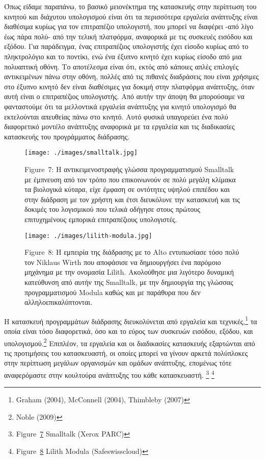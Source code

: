 \documentclass[
]{article}
\begin{document}
Όπως είδαμε παραπάνω, το βασικό μειονέκτημα της κατασκευής στην
περίπτωση του κινητού και διάχυτου υπολογισμού είναι ότι τα περισσότερα
εργαλεία ανάπτυξης είναι διαθέσιμα κυρίως για τον επιτραπέζιο
υπολογιστή, που μπορεί να διαφέρει -από λίγο έως πάρα πολύ- από την
τελική πλατφόρμα, αναφορικά με τις συσκευές εισόδου και εξόδου. Για
παράδειγμα, ένας επιτραπέζιος υπολογιστής έχει είσοδο κυρίως από το
πληκτρολόγιο και το ποντίκι, ενώ ένα έξυπνο κινητό έχει κυρίως είσοδο
από μια πολυαπτική οθόνη. Το αποτέλεσμα είναι ότι, εκτός από κάποιες
απλές επιλογές αντικειμένων πάνω στην οθόνη, πολλές από τις πιθανές
διαδράσεις που είναι χρήσιμες στο έξυπνο κινητό δεν είναι διαθέσιμες για
δοκιμή στην πλατφόρμα ανάπτυξης, όταν αυτή είναι ο επιτραπέζιος
υπολογιστής. Από αυτήν την άποψη θα μπορούσαμε να φανταστούμε ότι τα
μελλοντικά εργαλεία ανάπτυξης για κινητό υπολογισμό θα εκτελούνται
απευθείας πάνω στο κινητό. Αυτό φυσικά υπαγορεύει ένα πολύ διαφορετικό
μοντέλο ανάπτυξης αναφορικά με τα εργαλεία και τις διαδικασίες
κατασκευής του προγράμματος διάδρασης.

\leavevmode{}%
\begin{figure}
\hypertarget{fig:smalltalk}{%
\centering
\texttt{[image: ./images/smalltalk.jpg]}
\caption{Figure~7: Η αντικειμενοστραφής γλώσσα προγραμματισμού Smalltalk
με έμπνευση από τον τρόπο που επικοινωνούν σε πολύ μεγάλη κλίμακα τα
βιολογικά κύταρα, είχε έμφαση σε οντότητες υψηλού επιπέδου και στην
διάδραση με τον χρήστη και έτσι διευκόλυνε την κατασκευή και τις δοκιμές
του λογισμικού που τελικά οδήγησε στους πρώτους επιτυχημένους εμπορικά
επιτραπέζιους υπολογιστές.}\label{fig:smalltalk}
}
\end{figure}

\leavevmode{}%
\begin{figure}
\hypertarget{fig:lilith-modula}{%
\centering
\texttt{[image: ./images/lilith-modula.jpg]}
\caption{Figure~8: Η εμπειρία της διάδρασης με το Alto εντυπωσίασε τόσο
πολύ τον Niklaus Wirth που αποφάσισε να δημιουργήσει ένα παρόμοιο
μηχάνημα με την ονομασία Lilith. Ακολούθησε μια λιγότερο δυναμική
κατεύθυνση από αυτήν της Smalltalk, με την δημιουργία της γλώσσας
προγραμματισμού Modula καθώς και με παράθυρα που δεν
αλληλοεπικαλύπτονται.}\label{fig:lilith-modula}
}
\end{figure}

Η κατασκευή προγραμμάτων διάδρασης διευκολύνεται από εργαλεία και
τεχνικές,\footnote{Graham (2004), McConnell (2004), Thimbleby (2007)} τα
οποία είναι τόσο διαφορετικά, όσο και το εύρος των συσκευών εισόδου,
εξόδου, και υπολογισμού.\footnote{Noble (2009)} Επιπλέον, τα εργαλεία
και οι διαδικασίες κατασκευής εξαρτώνται από τις προτιμήσεις του
κατασκευαστή, οι οποίες μπορεί να γίνουν αρκετά πολύπλοκες στην
περίπτωση μεγάλων οργανισμών και ομάδων ανάπτυξης, επομένως τότε
αναφερόμαστε στην κουλτούρα ανάπτυξης του κάθε κατασκευαστή. \footnote{Figure~\protect\hyperlink{fig:smalltalk}{7}
  Smalltalk (Xerox PARC)} \footnote{Figure~\protect\hyperlink{fig:lilith-modula}{8}
  Lilith Modula (Safeswisscloud)}
\end{document}
